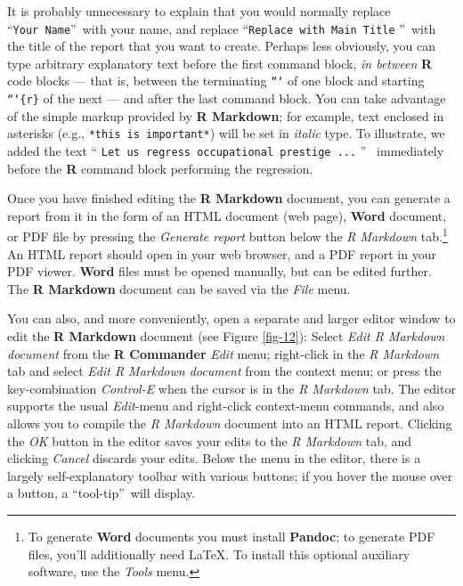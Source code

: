 \documentclass{article}%
\begin{document}
\noindent It is probably unnecessary to explain that you would normally
replace \textquotedblleft\texttt{Your\ Name}\textquotedblright\ with your
name, and replace \textquotedblleft\texttt{Replace\ with\ Main\ Title}%
\textquotedblright\ with the title of the report that you want to create.
Perhaps less obviously, you can type arbitrary explanatory text before the
first command block, \emph{in between} \textbf{R} code blocks --- that is,
between the terminating \texttt{```} of one block and starting \texttt{```\{r\}}
of the next --- and after the last command block. You can take advantage of
the simple markup provided by \textbf{R Markdown}; for example, text enclosed
in asterisks (e.g., \texttt{*this is important*}) will be set in
\textit{italic} type. To illustrate, we added the text \textquotedblleft%
\texttt{Let us regress occupational prestige ...} \textquotedblright%
\ immediately before the \textbf{R} command block performing the regression.

Once you have finished editing the \textbf{R Markdown} document, you can
generate a report from it in the form of an HTML document (web page), \textbf{Word} document,
or PDF file by pressing the \emph{Generate report}
button below the \emph{R Markdown} tab.\footnote{To generate \textbf{Word} documents you must
install \textbf{Pandoc}; to generate PDF files, you'll additionally
need \LaTeX. To install this optional auxiliary software, use the \emph{Tools} menu.}
An HTML report should open in your web browser, and a PDF report in your PDF viewer. 
\textbf{Word} files must be opened manually, but can be edited further.
The \textbf{R Markdown} document can be saved via the \emph{File} menu.

You can also, and more conveniently, open a separate and larger editor window to edit the \textbf{R
Markdown} document (see Figure \ref{fig-12}): Select \emph{Edit R Markdown
document} from the \textbf{R Commander} \emph{Edit} menu; right-click in the
\emph{R Markdown} tab and select \emph{Edit R Markdown document} from the
context menu; or press the key-combination \emph{Control-E} when the cursor is
in the \emph{R Markdown} tab. The editor supports the usual \emph{Edit}-menu
and right-click context-menu commands, and also allows you to compile the
\emph{R Markdown} document into an HTML report. Clicking the \emph{OK} button
in the editor saves your edits to the \emph{R Markdown} tab, and clicking
\emph{Cancel} discards your edits. Below the menu in the editor, there is a
largely self-explanatory toolbar with various buttons; if you hover the mouse
over a button, a \textquotedblleft tool-tip\textquotedblright\ will display.%
\end{document}
